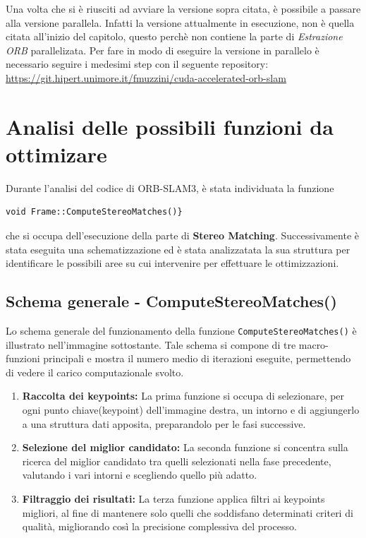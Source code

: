 \documentclass[12pt,a4paper]{report}
\begin{document}
\newline

Una volta che si è riusciti ad avviare la versione sopra citata, è possibile a passare alla versione parallela.
Infatti la versione attualmente in esecuzione, non è quella citata all'inizio del capitolo, questo perchè non contiene la parte di \textit{Estrazione ORB} parallelizata.
Per fare in modo di eseguire la versione in parallelo è necessario seguire i medesimi step con il seguente repository: \url{https://git.hipert.unimore.it/fmuzzini/cuda-accelerated-orb-slam}

\section{Analisi delle possibili funzioni da ottimizare}

Durante l'analisi del codice di ORB-SLAM3, è stata individuata la funzione 
\begin{lstlisting}
void Frame::ComputeStereoMatches()}
\end{lstlisting} 
che si occupa dell'esecuzione della parte di \textbf{Stereo Matching}. 
Successivamente è stata eseguita una schematizzazione ed è stata analizzatata la sua struttura per identificare le possibili aree su cui intervenire per effettuare le ottimizzazioni.

\subsection{Schema generale - ComputeStereoMatches() } \label{schema-generale-computeStereo}

Lo schema generale del funzionamento della funzione \texttt{ComputeStereoMatches()} è illustrato nell'immagine sottostante. Tale schema si compone di tre macro-funzioni principali e mostra il numero medio di iterazioni eseguite, permettendo di vedere il carico computazionale svolto.

\begin{enumerate}
    \item \textbf{Raccolta dei keypoints:} La prima funzione si occupa di selezionare, per ogni punto chiave(keypoint) dell'immagine destra, un intorno e di aggiungerlo a una struttura dati apposita, preparandolo per le fasi successive.
    \item \textbf{Selezione del miglior candidato:} La seconda funzione si concentra sulla ricerca del miglior candidato tra quelli selezionati nella fase precedente, valutando i vari intorni e scegliendo quello più adatto.
    \item \textbf{Filtraggio dei risultati:} La terza funzione applica filtri ai keypoints migliori, al fine di mantenere solo quelli che soddisfano determinati criteri di qualità, migliorando così la precisione complessiva del processo.
\end{enumerate}
\end{document}

